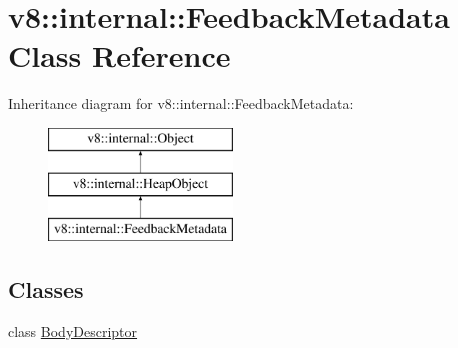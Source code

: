 \hypertarget{classv8_1_1internal_1_1FeedbackMetadata}{}\section{v8\+:\+:internal\+:\+:Feedback\+Metadata Class Reference}
\label{classv8_1_1internal_1_1FeedbackMetadata}
Inheritance diagram for v8\+:\+:internal\+:\+:Feedback\+Metadata\+:\begin{figure}[H]
\begin{center}
\leavevmode
\includegraphics[height=3.000000cm]{classv8_1_1internal_1_1FeedbackMetadata}
\end{center}
\end{figure}
\subsection*{Classes}
\begin{DoxyCompactItemize}
\item 
class \mbox{\hyperlink{classv8_1_1internal_1_1FeedbackMetadata_1_1BodyDescriptor}{Body\+Descriptor}}
\end{DoxyCompactItemize}
